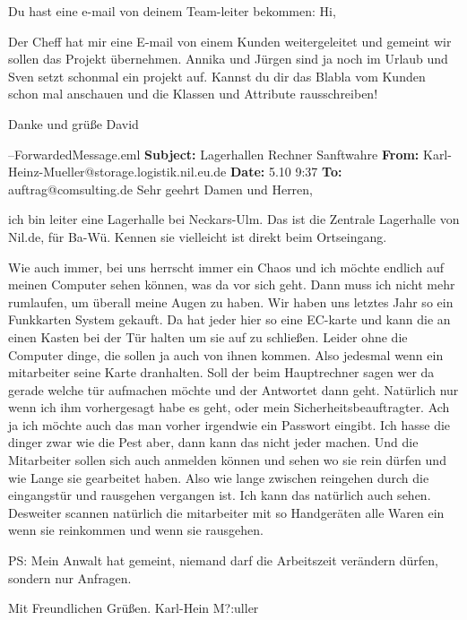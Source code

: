 Du hast eine e-mail von deinem Team-leiter bekommen:
Hi,

Der Cheff hat mir eine E-mail von einem Kunden weitergeleitet und gemeint wir sollen das Projekt übernehmen. Annika und Jürgen sind ja noch im Urlaub und Sven setzt schonmal ein projekt auf. Kannst du dir das Blabla vom Kunden schon mal anschauen und die Klassen und Attribute rausschreiben!

Danke und grüße
David

--ForwardedMessage.eml\hline
\textbf{Subject:} Lagerhallen Rechner Sanftwahre 
\textbf{From:} Karl-Heinz-Mueller@storage.logistik.nil.eu.de
\textbf{Date:} 5.10 9:37
\textbf{To:} auftrag@comsulting.de
Sehr geehrt Damen und Herren,

ich bin leiter eine Lagerhalle bei Neckars-Ulm. Das ist die Zentrale Lagerhalle von Nil.de, für Ba-Wü. Kennen sie vielleicht ist direkt beim Ortseingang.

Wie auch immer, bei uns herrscht immer ein Chaos und ich möchte endlich auf meinen Computer sehen können, was da vor sich geht. Dann muss ich nicht mehr rumlaufen, um überall meine Augen zu haben.
Wir haben uns letztes Jahr so ein Funkkarten System gekauft. Da hat jeder hier so eine EC-karte und kann die an einen Kasten bei der Tür halten um sie auf zu schließen. Leider ohne die Computer dinge, die sollen ja auch von ihnen kommen. Also jedesmal wenn ein mitarbeiter seine Karte dranhalten. Soll der beim Hauptrechner sagen wer da gerade welche tür aufmachen möchte und der Antwortet dann geht. Natürlich nur wenn ich ihm vorhergesagt habe es geht, oder mein Sicherheitsbeauftragter. Ach ja ich möchte auch das man vorher irgendwie ein Passwort eingibt. Ich hasse die dinger zwar wie die Pest aber, dann kann das nicht jeder machen. 
Und die Mitarbeiter sollen sich auch anmelden können und sehen wo sie rein dürfen und wie Lange sie gearbeitet haben. Also wie lange zwischen reingehen durch die eingangstür und rausgehen vergangen ist. Ich kann das natürlich auch sehen.\\
Desweiter scannen natürlich die mitarbeiter mit so Handgeräten alle Waren ein wenn sie reinkommen und wenn sie rausgehen.

PS: Mein Anwalt hat gemeint, niemand darf die Arbeitszeit verändern dürfen, sondern nur Anfragen.

Mit Freundlichen Grüßen.
Karl-Hein M?:uller